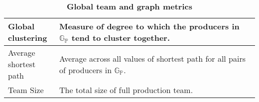 \begin{table}[H]
\vspace{6pt}

\begin{subtable}[b]{\textwidth}
\caption{\textbf{Global team and graph metrics}}
\centering
\begin{tabular}{@{}p{3cm}@{} p{12.0cm}@{}}

\toprule
\parbox[t]{2.5cm}{Global \\ clustering} & Measure of degree to which the producers in $\mathbb{G}_\mathbb{P}$ tend to cluster together.\\
\midrule
\parbox[t]{2.5cm}{Average\\ shortest path} & Average across all values of shortest path for all pairs of producers in $\mathbb{G}_\mathbb{P}$.\\
\midrule
\parbox[t]{2.5cm}{Team Size} & The total size of full production team.\\
\bottomrule
\end{tabular}
\end{subtable}

\end{table}

